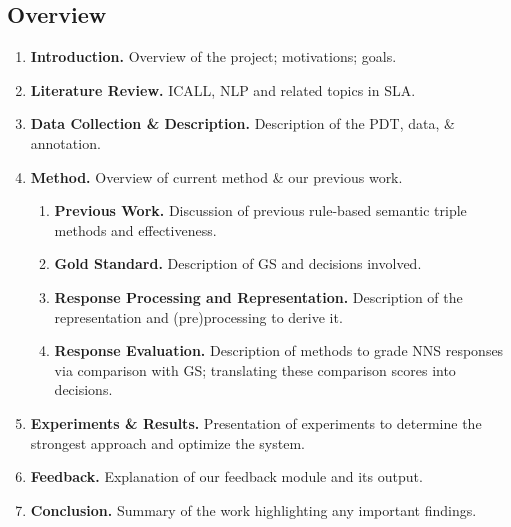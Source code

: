 \subsection{Overview}
\label{overview}
\begin{enumerate}
\item{\textbf{Introduction.} Overview of the project; motivations; goals.}
\item{\textbf{Literature Review.} ICALL, NLP and related topics in SLA.}
\item{\textbf{Data Collection \& Description.} Description of the PDT, data, \& annotation.}
\item{\textbf{Method.} Overview of current method \& our previous work. 
\begin{enumerate}
\item{\textbf{Previous Work.} Discussion of previous rule-based semantic triple methods and effectiveness.}
\item{\textbf{Gold Standard.} Description of GS and decisions involved.}
\item{\textbf{Response Processing and Representation.} Description of the representation and (pre)processing to derive it.} 
\item{\textbf{Response Evaluation.} Description of methods to grade NNS responses via comparison with GS; translating these comparison scores into decisions.} 
\end{enumerate}}
\item{\textbf{Experiments \& Results.}} Presentation of experiments to determine the strongest approach and optimize the system.
\item{\textbf{Feedback.} Explanation of our feedback module and its output.}
\item{\textbf{Conclusion.} Summary of the work highlighting any important findings.}
\end{enumerate}
